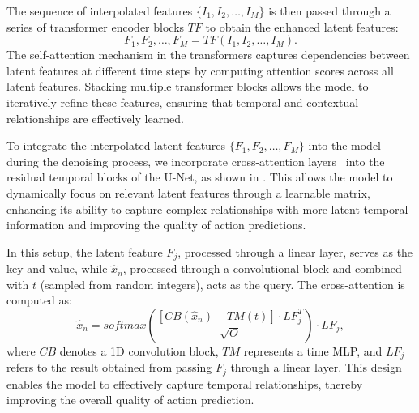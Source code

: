 The sequence of interpolated features $\{I_1, I_2, \dots, I_M\}$ is then passed through a series of transformer encoder blocks $TF$ to obtain the enhanced latent features:
\begin{equation}
    F_1, F_2, \dots, F_M = TF(I_1, I_2, \dots, I_M).
\end{equation}
The self-attention mechanism in the transformers captures dependencies between latent features at different time steps by computing attention scores across all latent features. Stacking multiple transformer blocks allows the model to iteratively refine these features, ensuring that temporal and contextual relationships are effectively learned.


To integrate the interpolated latent features $\{F_1, F_2, \dots, F_M\}$ into the model during the denoising process, we incorporate cross-attention layers~\citep{khachatryan2023text2video} into the residual temporal blocks of the U-Net, as shown in . This allows the model to dynamically focus on relevant latent features through a learnable matrix, enhancing its ability to capture complex relationships with more latent temporal information and improving the quality of action predictions.

In this setup, the latent feature $F_j$, processed through a linear layer, serves as the key and value, while $\hat{x}_n$, processed through a convolutional block and combined with $t$ (sampled from random integers), acts as the query. The cross-attention is computed as:
\begin{equation}
    \hat{x}_n = softmax\left(\frac{\left[CB(\hat{x}_n) + TM(t)\right] \cdot LF_j^T}{\sqrt{O}}\right) \cdot LF_j,
\end{equation}
where $CB$ denotes a 1D convolution block, $TM$ represents a time MLP, and $LF_j$ refers to the result obtained from passing $F_j$ through a linear layer. This design enables the model to effectively capture temporal relationships, thereby improving the overall quality of action prediction.

